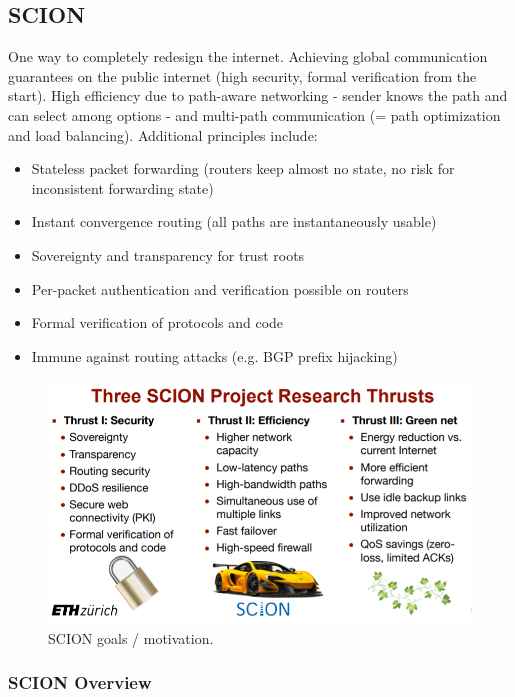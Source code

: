 \subsection{SCION}

One way to completely redesign the internet. Achieving global communication guarantees on the public internet (high security, formal verification from the start). High efficiency due to path-aware networking - sender knows the path and can select among options - and multi-path communication (= path optimization and load balancing). Additional principles include: 

\begin{itemize}
    \item Stateless packet forwarding (routers keep almost no state, no risk for inconsistent forwarding state)
    \item Instant convergence routing (all paths are instantaneously usable)
    \item Sovereignty and transparency for trust roots
    \item Per-packet authentication and verification possible on routers
    \item Formal verification of protocols and code
    \item Immune against routing attacks (e.g. BGP prefix hijacking)
\end{itemize}

\begin{figure}[h]
	\centering
	\includegraphics[scale=0.7]{images/910-why.PNG}
	\caption{SCION goals / motivation.}
	\label{fig:why}
\end{figure}

\subsubsection{SCION Overview}

